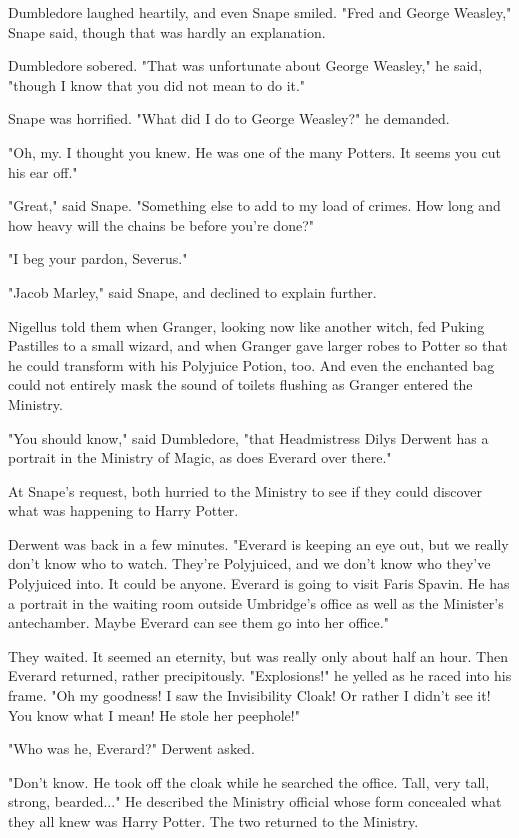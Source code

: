 \documentclass[a4paper,11pt]{article}
\begin{document}
Dumbledore laughed heartily, and even Snape smiled. "Fred and George Weasley," Snape said, though that was hardly an explanation.

Dumbledore sobered. "That was unfortunate about George Weasley," he said, "though I know that you did not mean to do it."

Snape was horrified. "What did I do to George Weasley?" he demanded.

"Oh, my. I thought you knew. He was one of the many Potters. It seems you cut his ear off."

"Great," said Snape. "Something else to add to my load of crimes. How long and how heavy will the chains be before you're done?"

"I beg your pardon, Severus."

"Jacob Marley," said Snape, and declined to explain further.

Nigellus told them when Granger, looking now like another witch, fed Puking Pastilles to a small wizard, and when Granger gave larger robes to Potter so that he could transform with his Polyjuice Potion, too. And even the enchanted bag could not entirely mask the sound of toilets flushing as Granger entered the Ministry.

"You should know," said Dumbledore, "that Headmistress Dilys Derwent has a portrait in the Ministry of Magic, as does Everard over there."

At Snape's request, both hurried to the Ministry to see if they could discover what was happening to Harry Potter.

Derwent was back in a few minutes. "Everard is keeping an eye out, but we really don't know who to watch. They're Polyjuiced, and we don't know who they've Polyjuiced into. It could be anyone. Everard is going to visit Faris Spavin. He has a portrait in the waiting room outside Umbridge's office as well as the Minister's antechamber. Maybe Everard can see them go into her office."

They waited. It seemed an eternity, but was really only about half an hour. Then Everard returned, rather precipitously. "Explosions!" he yelled as he raced into his frame. "Oh my goodness! I saw the Invisibility Cloak! Or rather I didn't see it! You know what I mean! He stole her peephole!"

"Who was he, Everard?" Derwent asked.

"Don't know. He took off the cloak while he searched the office. Tall, very tall, strong, bearded..." He described the Ministry official whose form concealed what they all knew was Harry Potter. The two returned to the Ministry.
\end{document}

